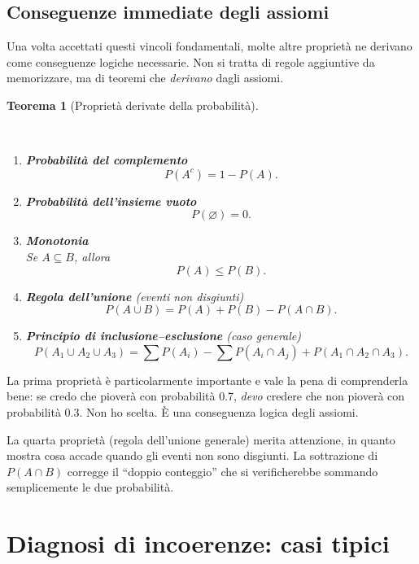 \documentclass[
  italian,
  letterpaper,
  a4paper,
  11pt,
  open=any]{scrbook}
\theoremstyle{plain}
\newtheorem{theorem}{Teorema}[chapter]
\theoremstyle{definition}
\theoremstyle{definition}
\theoremstyle{remark}
\begin{document}
\subsection{Conseguenze immediate degli
assiomi}\label{conseguenze-immediate-degli-assiomi}

Una volta accettati questi vincoli fondamentali, molte altre proprietà
ne derivano come conseguenze logiche necessarie. Non si tratta di regole
aggiuntive da memorizzare, ma di teoremi che \emph{derivano} dagli
assiomi.

\begin{theorem}[Proprietà derivate della
probabilità]\protect\hypertarget{thm-probability-properties}{}\label{thm-probability-properties}

~

\begin{enumerate}
\def\labelenumi{\arabic{enumi}.}
\item
  \textbf{Probabilità del complemento}\\
  \[P(A^c) = 1 - P(A).\]
\item
  \textbf{Probabilità dell'insieme vuoto}\\
  \[P(\varnothing) = 0.\]
\item
  \textbf{Monotonia}\\
  Se \(A \subseteq B\), allora \[P(A) \leq P(B).\]
\item
  \textbf{Regola dell'unione} (eventi non disgiunti)\\
  \[P(A \cup B) = P(A) + P(B) - P(A \cap B).\]
\item
  \textbf{Principio di inclusione--esclusione} (caso generale)\\
  \[P(A_1 \cup A_2 \cup A_3)
  = \sum P(A_i)
  - \sum P(A_i \cap A_j)
  + P(A_1 \cap A_2 \cap A_3).\]
\end{enumerate}

\end{theorem}

La prima proprietà è particolarmente importante e vale la pena di
comprenderla bene: se credo che pioverà con probabilità 0.7, \emph{devo}
credere che non pioverà con probabilità 0.3. Non ho scelta. È una
conseguenza logica degli assiomi.

La quarta proprietà (regola dell'unione generale) merita attenzione, in
quanto mostra cosa accade quando gli eventi non sono disgiunti. La
sottrazione di \(P(A \cap B)\) corregge il ``doppio conteggio'' che si
verificherebbe sommando semplicemente le due probabilità.

\section{Diagnosi di incoerenze: casi
tipici}\label{diagnosi-di-incoerenze-casi-tipici}
\end{document}
